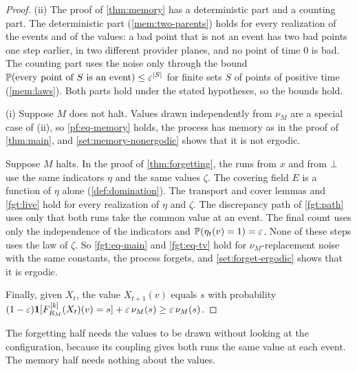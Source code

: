 \begin{proof}
(ii) The proof of \cref{thm:memory} has a deterministic part and a counting part. The deterministic part (\cref{mem:two-parents}) holds for every realization of the events and of the values: a bad point that is not an event has two bad points one step earlier, in two different provider planes, and no point of time $0$ is bad. The counting part uses the noise only through the bound $\mathbb{P}(\text{every point of }S\text{ is an event})\le\varepsilon^{|S|}$ for finite sets $S$ of points of positive time (\cref{mem:laws}). Both parts hold under the stated hypotheses, so the bounds hold.

(i) Suppose $M$ does not halt. Values drawn independently from $\nu_M$ are a special case of (ii), so \eqref{pf:eq-memory} holds, the process has memory as in the proof of \cref{thm:main}, and \cref{set:memory-nonergodic} shows that it is not ergodic.

Suppose $M$ halts. In the proof of \cref{thm:forgetting}, the runs from $x$ and from $\bot$ use the same indicators $\eta$ and the same values $\zeta$. The covering field $E$ is a function of $\eta$ alone (\cref{def:domination}). The transport and cover lemmas and \cref{fgt:live} hold for every realization of $\eta$ and $\zeta$. The discrepancy path of \cref{fgt:path} uses only that both runs take the common value at an event. The final count uses only the independence of the indicators and $\mathbb{P}(\eta_t(v)=1)=\varepsilon$. None of these steps uses the law of $\zeta$. So \eqref{fgt:eq-main} and \eqref{fgt:eq-tv} hold for $\nu_M$-replacement noise with the same constants, the process forgets, and \cref{set:forget-ergodic} shows that it is ergodic.

Finally, given $X_t$, the value $X_{t+1}(v)$ equals $s$ with probability $(1-\varepsilon)\mathbf 1[F^{[k]}_{R_M}(X_t)(v)=s]+\varepsilon\,\nu_M(s)\ge\varepsilon\,\nu_M(s)$.
\end{proof}

The forgetting half needs the values to be drawn without looking at the configuration, because its coupling gives both runs the same value at each event. The memory half needs nothing about the values.

